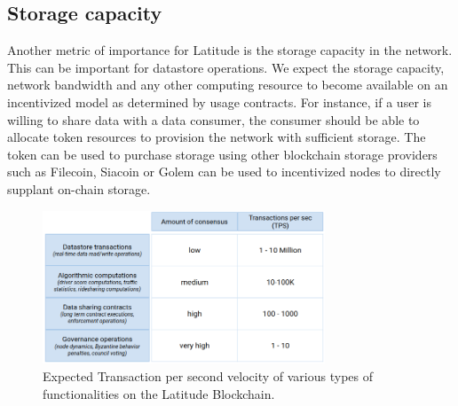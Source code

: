 \subsection{Storage capacity}
Another metric of importance for Latitude is the storage capacity in the network. This can be important for
datastore operations. We expect the storage capacity, network bandwidth and any other computing resource to become
available on an incentivized model as determined by usage contracts. For instance, if a user is willing to share data with
a data consumer, the consumer should be able to allocate token resources to provision the network with sufficient
storage. The token can be used to purchase storage using other blockchain storage providers such as Filecoin, Siacoin or
Golem can be used to incentivized nodes to directly supplant on-chain storage.

\begin{figure}[t]
    \centering
    \includegraphics[width=0.75\textwidth]{tps_lat2.png}
  \caption{Expected Transaction per second velocity of various types of functionalities on the Latitude Blockchain.}
    \label{fig:tps_lat}
\end{figure}

